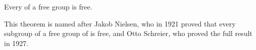\documentclass[12pt]{article}
\begin{document}

Every  of a free group is free.

This theorem is named after Jakob Nielsen, who in 1921 proved that every subgroup of a free group of  is free, and Otto Schreier, who proved the full result in 1927.
\end{document}
